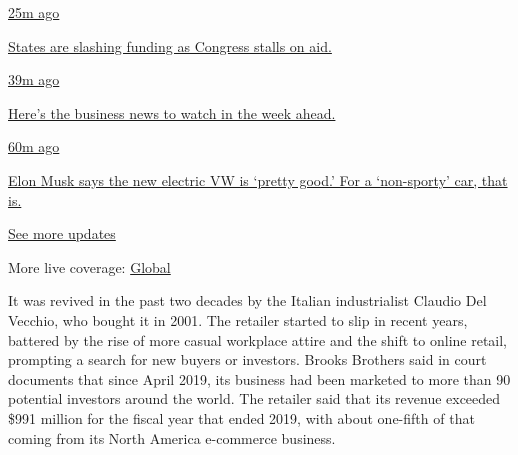 \href{https://www.nytimes3xbfgragh.onion/live/2020/09/08/business/stock-market-today-coronavirus?action=click\&pgtype=Article\&state=default\&region=MAIN_CONTENT_1\&context=storylines_live_updates\#states-are-slashing-funding-as-congress-stalls-on-aid}{25m
ago}

\href{https://www.nytimes3xbfgragh.onion/live/2020/09/08/business/stock-market-today-coronavirus?action=click\&pgtype=Article\&state=default\&region=MAIN_CONTENT_1\&context=storylines_live_updates\#states-are-slashing-funding-as-congress-stalls-on-aid}{States
are slashing funding as Congress stalls on aid.}

\href{https://www.nytimes3xbfgragh.onion/live/2020/09/08/business/stock-market-today-coronavirus?action=click\&pgtype=Article\&state=default\&region=MAIN_CONTENT_1\&context=storylines_live_updates\#heres-the-business-news-to-watch-in-the-week-ahead}{39m
ago}

\href{https://www.nytimes3xbfgragh.onion/live/2020/09/08/business/stock-market-today-coronavirus?action=click\&pgtype=Article\&state=default\&region=MAIN_CONTENT_1\&context=storylines_live_updates\#heres-the-business-news-to-watch-in-the-week-ahead}{Here's
the business news to watch in the week ahead.}

\href{https://www.nytimes3xbfgragh.onion/live/2020/09/08/business/stock-market-today-coronavirus?action=click\&pgtype=Article\&state=default\&region=MAIN_CONTENT_1\&context=storylines_live_updates\#elon-musk-says-the-new-electric-vw-is-pretty-good-for-a-non-sporty-car-that-is}{60m
ago}

\href{https://www.nytimes3xbfgragh.onion/live/2020/09/08/business/stock-market-today-coronavirus?action=click\&pgtype=Article\&state=default\&region=MAIN_CONTENT_1\&context=storylines_live_updates\#elon-musk-says-the-new-electric-vw-is-pretty-good-for-a-non-sporty-car-that-is}{Elon
Musk says the new electric VW is `pretty good.' For a `non-sporty' car,
that is.}

\href{https://www.nytimes3xbfgragh.onion/live/2020/09/08/business/stock-market-today-coronavirus?action=click\&pgtype=Article\&state=default\&region=MAIN_CONTENT_1\&context=storylines_live_updates}{See
more updates}

More live coverage:
\href{https://www.nytimes3xbfgragh.onion/2020/09/08/world/covid-19-coronavirus.html?action=click\&pgtype=Article\&state=default\&region=MAIN_CONTENT_1\&context=storylines_live_updates}{Global}

It was revived in the past two decades by the Italian industrialist
Claudio Del Vecchio, who bought it in 2001. The retailer started to slip
in recent years, battered by the rise of more casual workplace attire
and the shift to online retail, prompting a search for new buyers or
investors. Brooks Brothers said in court documents that since April
2019, its business had been marketed to more than 90 potential investors
around the world. The retailer said that its revenue exceeded \$991
million for the fiscal year that ended 2019, with about one-fifth of
that coming from its North America e-commerce business.

